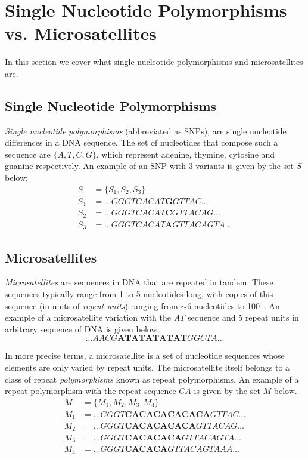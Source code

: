 \section{Single Nucleotide Polymorphisms vs. Microsatellites}\label{sec:snpvm}
In this section we cover what single nucleotide polymorphisms and microsatellites are.

\subsection{Single Nucleotide Polymorphisms}\label{subsec:snp}
\emph{Single nucleotide polymorphisms} (abbreviated as SNPs), are single nucleotide differences in a DNA sequence.
The set of nucleotides that compose such a sequence are $\{ A, T, C, G \}$, which represent adenine, thymine,
cytosine and guanine respectively.
An example of an SNP with 3 variants is given by the set $S$ below:
\begin{align*}
    S &= \{ S_1, S_2, S_3 \} \\
    S_1 &= \ldots \mathit{GGGTCACAT}\textbf{G}\mathit{GTTAC} \ldots \\
    S_2 &= \ldots \mathit{GGGTCACAT}\textbf{C}\mathit{GTTACAG} \ldots \\
    S_3 &= \ldots \mathit{GGGTCACAT}\textbf{A}\mathit{GTTACAGTA} \ldots
\end{align*}

\subsection{Microsatellites}\label{subsec:m}
\emph{Microsatellites} are sequences in DNA that are repeated in tandem.
These sequences typically range from 1 to 5 nucleotides long, with copies of this sequence (in units of
\emph{repeat units}) ranging from $\sim 6$ nucleotides to
100~\cite{roseThresholdSizeMicrosatellite1998,fanBriefReviewShort2007}.
An example of a microsatellite variation with the $AT$ sequence and 5 repeat units in arbitrary
sequence of DNA is given below.
\begin{equation*}
     \ldots \mathit{AACG}\textbf{ATATATATAT}\mathit{GGCTA} \ldots
\end{equation*}

In more precise terms, a microsatellite is a set of nucleotide sequences whose elements are only varied by repeat units.
The microsatellite itself belongs to a class of repeat \emph{polymorphisms} known as repeat polymorphisms.
An example of a repeat polymorphism with the repeat sequence $CA$ is given by the set $M$ below.
\begin{align*}
    M &= \{ M_1, M_2, M_3, M_4 \} \\
    M_1 &= \ldots \mathit{GGGT}\textbf{CACACACACACA}\mathit{GTTAC} \ldots \\
    M_2 &= \ldots \mathit{GGGT}\textbf{CACACACACA}\mathit{GTTACAG} \ldots \\
    M_3 &= \ldots \mathit{GGGT}\textbf{CACACACA}\mathit{GTTACAGTA} \ldots \\
    M_4 &= \ldots \mathit{GGGT}\textbf{CACACA}\mathit{GTTACAGTAAA} \ldots
\end{align*}

